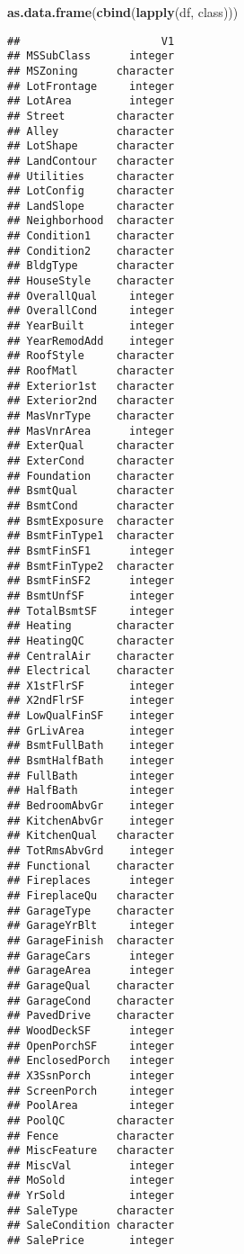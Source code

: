 \documentclass[]{article}
\newenvironment{Shaded}{\begin{snugshade}}{\end{snugshade}}
\newcommand{\KeywordTok}[1]{\textcolor[rgb]{0.13,0.29,0.53}{\textbf{#1}}}
\newcommand{\NormalTok}[1]{#1}
\begin{document}
\begin{Shaded}
\begin{Highlighting}[]
\KeywordTok{as.data.frame}\NormalTok{(}\KeywordTok{cbind}\NormalTok{(}\KeywordTok{lapply}\NormalTok{(df, class)))}
\end{Highlighting}
\end{Shaded}

\begin{verbatim}
##                      V1
## MSSubClass      integer
## MSZoning      character
## LotFrontage     integer
## LotArea         integer
## Street        character
## Alley         character
## LotShape      character
## LandContour   character
## Utilities     character
## LotConfig     character
## LandSlope     character
## Neighborhood  character
## Condition1    character
## Condition2    character
## BldgType      character
## HouseStyle    character
## OverallQual     integer
## OverallCond     integer
## YearBuilt       integer
## YearRemodAdd    integer
## RoofStyle     character
## RoofMatl      character
## Exterior1st   character
## Exterior2nd   character
## MasVnrType    character
## MasVnrArea      integer
## ExterQual     character
## ExterCond     character
## Foundation    character
## BsmtQual      character
## BsmtCond      character
## BsmtExposure  character
## BsmtFinType1  character
## BsmtFinSF1      integer
## BsmtFinType2  character
## BsmtFinSF2      integer
## BsmtUnfSF       integer
## TotalBsmtSF     integer
## Heating       character
## HeatingQC     character
## CentralAir    character
## Electrical    character
## X1stFlrSF       integer
## X2ndFlrSF       integer
## LowQualFinSF    integer
## GrLivArea       integer
## BsmtFullBath    integer
## BsmtHalfBath    integer
## FullBath        integer
## HalfBath        integer
## BedroomAbvGr    integer
## KitchenAbvGr    integer
## KitchenQual   character
## TotRmsAbvGrd    integer
## Functional    character
## Fireplaces      integer
## FireplaceQu   character
## GarageType    character
## GarageYrBlt     integer
## GarageFinish  character
## GarageCars      integer
## GarageArea      integer
## GarageQual    character
## GarageCond    character
## PavedDrive    character
## WoodDeckSF      integer
## OpenPorchSF     integer
## EnclosedPorch   integer
## X3SsnPorch      integer
## ScreenPorch     integer
## PoolArea        integer
## PoolQC        character
## Fence         character
## MiscFeature   character
## MiscVal         integer
## MoSold          integer
## YrSold          integer
## SaleType      character
## SaleCondition character
## SalePrice       integer
\end{verbatim}
\end{document}
